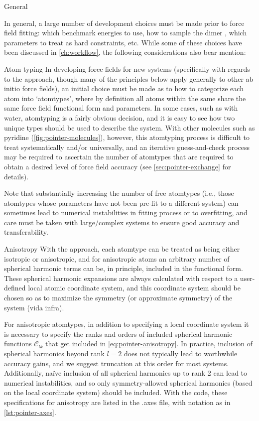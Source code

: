 \begin{subsection}{General}

In general, a large number of development choices must be made prior to force field
fitting: which benchmark energies to use, how to sample the dimer \pes, which
parameters to treat as hard constraints, etc. While some of these choices have
been discussed in \cref{ch:workflow}, the following considerations also bear
mention:

\begin{paragraph}{Atom-typing}
In developing force fields for new systems (specifically with regards to the \mastiff approach, though
many of the principles below apply generally to other ab initio force fields),
an initial choice must be made as to how to categorize each atom into 
`atomtypes', where by definition all atoms within the same \atomtype share the
same force field functional form and parameters. In some cases, such as with
water, atomtyping is a fairly obvious decision, and it is easy to see how two
unique types should be used to describe the system. With other molecules
such as pyridine (\cref{fig:pointer-molecules}), however, this
atomtyping process is difficult to treat systematically and/or universally, and an iterative
guess-and-check process may be required to ascertain the number of atomtypes
that are required to obtain a desired level of force field accuracy (see
\cref{sec:pointer-exchange} for details).

Note that substantially increasing the number of free atomtypes (i.e., those
atomtypes whose parameters have not been pre-fit to a different system) 
can sometimes lead to numerical instabilities in fitting process or to
overfitting,\cite{Hawkins2004} and care must be taken with large/complex
systems to ensure good accuracy and transferability. 
\end{paragraph}

\begin{paragraph}{Anisotropy}
With the \mastiff approach, each atomtype can be treated as being either
isotropic or anisotropic, and for anisotropic atoms an arbitrary number of
spherical harmonic terms can be, in principle, included in the functional form. These spherical
harmonic expansions are always calculated with respect to a user-defined local
atomic coordinate system, and this coordinate system should be chosen so as to
maximize the symmetry (or approximate symmetry) of the system (vida infra).

For anisotropic atomtypes, in addition to specifying a local coordinate system
it is necessary to specify the ranks and orders of included spherical harmonic
functions $\mathcal{C}_{lk}$ that get included in
\cref{eq:pointer-anisotropy}. In practice, inclusion of spherical harmonics
beyond rank $l=2$ does not typically lead to worthwhile accuracy gains, and we
suggest truncation at this order for most systems.  Additionally, na\"ive
inclusion of all spherical harmonics up to rank 2 can lead to numerical
instabilities, and so only symmetry-allowed spherical harmonics (based on the
local coordinate system) should be included.  With the \pointer code, these
specifications for anisotropy are listed in the .axes file, with notation as
in \cref{lst:pointer-axes}. 


\end{paragraph}
\end{subsection}
